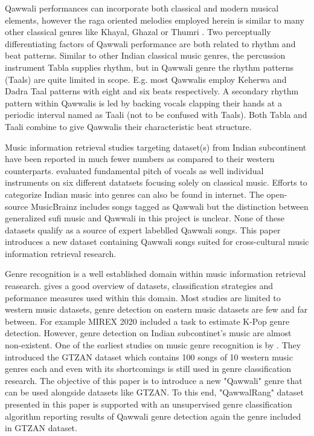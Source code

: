 \documentclass{article}
\begin{document}
Qawwali performances can incorporate both classical and modern musical elements, however the raga oriented melodies employed herein is similar to many other classical genres like Khayal, Ghazal or Thumri \citep{qureshi1986sufi}. Two perceptually differentiating factors of Qawwali performance are both related to rhythm and beat patterns. Similar to other Indian classical music genres, the percussion instrument Tabla  supplies rhythm, but in Qawwali genre the rhythm patterns (Taals) are quite limited in scope. E.g. most Qawwalis employ Keherwa  and Dadra Taal patterns with eight and six beats respectively. A secondary rhythm pattern within Qawwalis is led by backing vocals clapping their hands at a periodic interval named as Taali (not to be confused with Taals). Both Tabla and Taali combine to give Qawwalis their characteristic beat structure.

Music information retrieval studies targeting dataset(s) from Indian subcontinent have been reported in much fewer numbers as compared to their western counterparts.\citep{carnatic_music} evaluated fundamental pitch of vocals as well individual instruments on six different datatsets focusing solely on classical music. Efforts to categorize Indian music into genres can also be found in internet. The open-source MusicBrainz includes songs tagged as Qawwali but the distinction between generalized sufi music and Qawwali in this project is unclear. None of these datasets qualify as a source of expert labeblled Qawwali songs. This paper introduces a new dataset containing Qawwali songs suited for cross-cultural music information retrieval research.

Genre recognition is a well established domain within music information retrieval reasearch. \cite{music_genre_survey} gives a good overview of datasets, classification strategies and peformance measures used within this domain. Most studies are limited to western music datasets, genre detection on eastern music datasets are few and far between. For example MIREX 2020 \citep{mirex} included a task to estimate K-Pop genre detection. However, genre detection on Indian subcontinet's music are almost non-existent. One of the earliest studies on music genre recognition is by \cite{gtzan}. They introduced the GTZAN dataset which contains 100 songs of 10 western music genres each and even with its shortcomings is still used in genre classification research. The objective of this paper is to introduce a new "Qawwali" genre that can be used alongside datasets like GTZAN. To this end, "QawwalRang" dataset presented in this paper is supported with an unsupervised genre classification algorithm  reporting results of Qawwali genre detection again the genre included in GTZAN dataset.
\end{document}
